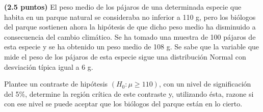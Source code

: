 
\textbf{(2.5 puntos)} El peso medio de los pájaros de una determinada especie que habita en un parque natural se consideraba no inferior a 110 g, pero los biólogos del parque sostienen ahora la hipótesis de que dicho peso medio ha disminuido a consecuencia del cambio climático. Se ha tomado una muestra de 100 pájaros de esta especie y se ha obtenido un peso medio de 108 g. Se sabe que la variable que mide el peso de los pájaros de esta especie sigue una distribución Normal con desviación típica igual a 6 g.

Plantee un contraste de hipótesis $(H_0:\mu\geq110)$, con un nivel de significación del 5\%, determine la región crítica de este contraste y, utilizando ésta, razone si con ese nivel se puede aceptar que los biólogos del parque están en lo cierto.
